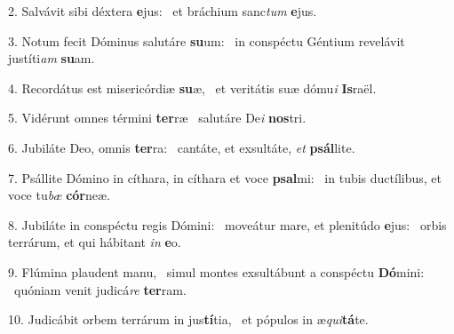 2. Salvávit sibi déxtera \textbf{e}jus: \ast\  et bráchium sanc\textit{tum} \textbf{e}jus.\

3. Notum fecit Dóminus salutáre \textbf{su}um: \ast\  in conspéctu Géntium revelávit justíti\textit{am} \textbf{su}am.\

4. Recordátus est misericórdiæ \textbf{su}æ, \ast\  et veritátis suæ dómu\textit{i} \textbf{Is}raël.\

5. Vidérunt omnes términi \textbf{ter}ræ \ast\  salutáre De\textit{i} \textbf{nos}tri.\

6. Jubiláte Deo, omnis \textbf{ter}ra: \ast\  cantáte, et exsultáte, \textit{et} \textbf{psál}lite.\

7. Psállite Dómino in cíthara, in cíthara et voce \textbf{psal}mi: \ast\  in tubis ductílibus, et voce tu\textit{bæ} \textbf{cór}neæ.\

8. Jubiláte in conspéctu regis Dómini: \dag\  moveátur mare, et plenitúdo \textbf{e}jus: \ast\  orbis terrárum, et qui hábitant \textit{in} \textbf{e}o.\

9. Flúmina plaudent manu, \dag\  simul montes exsultábunt a conspéctu \textbf{Dó}mini: \ast\  quóniam venit judicá\textit{re} \textbf{ter}ram.\

10. Judicábit orbem terrárum in jus\textbf{tí}tia, \ast\  et pópulos in æ\textit{qui}\textbf{tá}te.\

